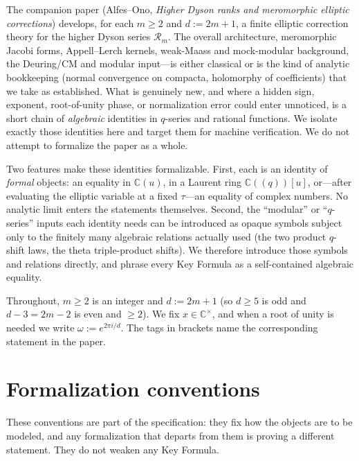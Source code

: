 \documentclass[11pt]{article}
\newcommand{\C}{\mathbb{C}}
\newcommand{\RR}{\mathcal{R}}
\theoremstyle{definition}
\begin{document}
The companion paper (Alfes--Ono, \emph{Higher Dyson ranks and meromorphic elliptic
corrections}) develops, for each $m\ge 2$ and $d:=2m+1$, a finite elliptic correction theory
for the higher Dyson series $\RR_m$. The overall architecture, meromorphic Jacobi forms,
Appell--Lerch kernels, weak-Maass and mock-modular background, the Deuring/CM and modular
input---is either classical or is the kind of analytic bookkeeping (normal convergence on
compacta, holomorphy of coefficients) that we take as established. What is genuinely new, and
where a hidden sign, exponent, root-of-unity phase, or normalization error could enter
unnoticed, is a short chain of \emph{algebraic} identities in $q$-series and rational functions.
We isolate exactly those identities here and target them for machine verification. We do not
attempt to formalize the paper as a whole.

Two features make these identities formalizable. First, each is an identity of \emph{formal}
objects: an equality in $\C(u)$, in a Laurent ring $\C((q))[u]$, or---after evaluating the
elliptic variable at a fixed $\tau$---an equality of complex numbers. No analytic limit enters
the statements themselves. Second, the ``modular'' or ``$q$-series'' inputs each identity needs
can be introduced as opaque symbols subject only to the finitely many algebraic relations
actually used (the two product $q$-shift laws, the theta triple-product shifts). We therefore
introduce those symbols and relations directly, and phrase every Key Formula as a
self-contained algebraic equality.

Throughout, $m\ge 2$ is an integer and $d:=2m+1$ (so $d\ge 5$ is odd and $d-3=2m-2$ is even and
$\ge 2$). We fix $x\in\C^\times$, and when a root of unity is needed we write $\omega:=e^{2\pi i/d}$.
The tags in brackets name the corresponding statement in the paper.

\section*{Formalization conventions}

These conventions are part of the specification: they fix how the objects are to be modeled,
and any formalization that departs from them is proving a different statement. They do not
weaken any Key Formula.
\end{document}

